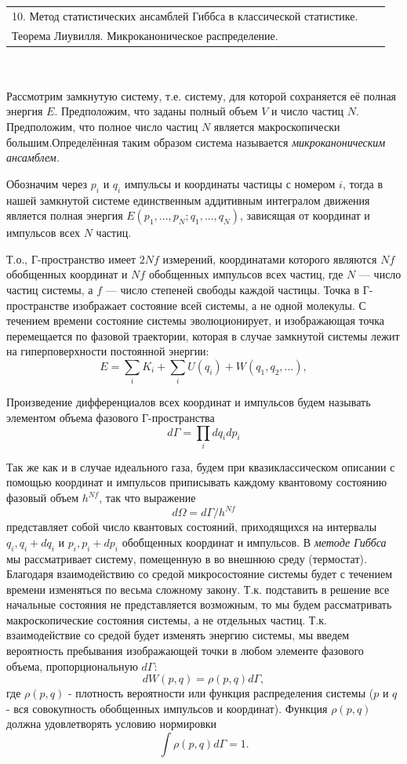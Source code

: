 \documentclass[14pt,a4paper]{scrartcl}
\begin{document}
	 \begin{tabular}[t]{|l|ll|} 
	 	\hline
	 	10. Метод статистических ансамблей Гиббса в классической статистике.\\ Теорема Лиувилля. Микроканоническое распределение.
\\
	 	\hline
	 \end{tabular}\\\\
 
 	\quad Рассмотрим замкнутую систему, т.е. систему, для которой сохраняется её полная энергия
 	$E$. Предположим, что заданы полный объем $V$ и число частиц $N$. Предположим, что
 	полное число частиц $N$ является макроскопически большим.Определённая
 	таким образом система называется \textit{микроканоническим ансамблем. }
 	
 	\quad Обозначим через $p_i$ и $q_i$ импульсы и координаты частицы с номером $i$, тогда в нашей
 	замкнутой системе единственным аддитивным интегралом движения является полная
 	энергия $E(p_1, ..., p_N; q_1, ..., q_N)$, зависящая от координат и импульсов всех $N$ частиц. 
 	
 	\quad Т.о., Г-пространство имеет $2Nf$ измерений, координатами которого являются $Nf$ обобщенных координат и $Nf$ обобщенных импульсов всех частиц, где $N$ — число частиц системы, а $f$ — число степеней свободы каждой частицы. Точка в Г-пространстве изображает состояние всей системы, а не одной молекулы. С течением времени состояние системы эволюционирует, и изображающая точка перемещается по фазовой траектории, которая в случае замкнутой системы лежит на гиперповерхности
 	постоянной энергии:
 	$$E = \sum_i K_i +\sum_i U(q_i) +W(q_1, q_2,...),$$
 	
 	\quad Произведение дифференциалов всех координат и импульсов будем называть элементом объема  	фазового Г-пространства
 	$$d\Gamma = \prod_i dq_i dp_i$$ 
 	
 	\quad Так же как и в случае идеального газа, будем при квазиклассическом описании с помощью координат и импульсов приписывать каждому квантовому состоянию фазовый объем $h^{Nf}$, так что выражение
 	$$d\Omega = d\Gamma / h^{Nf}$$
 	представляет собой число квантовых состояний, приходящихся на интервалы $q_i, q_i +dq_i$ и $p_i, p_i +dp_i$ обобщенных координат и импульсов.
 	\quad В \textit{методе Гиббса} мы рассматривает систему, помещенную в во внешнюю среду (термостат). Благодаря взаимодействию со средой микросостояние системы будет с течением времени изменяться по
 	весьма сложному закону. Т.к. подставить в решение все начальные состояния не представляется возможным, то мы будем рассматривать макроскопические состояния системы, а не отдельных частиц. Т.к. взаимодействие со средой будет изменять энергию системы, мы  введем вероятность пребывания изображающей точки в любом элементе фазового объема, пропорциональную $d\Gamma$:
 	$$dW(p,q) = \rho(p,q)d\Gamma,$$ 
 	где  $ \rho(p,q) $ - плотность вероятности или функция распределения системы ($p$ и $q$ - вся совокупность обобщенных импульсов и координат). Функция $\rho(p,q)$ должна удовлетворять условию нормировки
 	$$\int \rho(p,q)d\Gamma = 1.$$
 	
\end{document}
